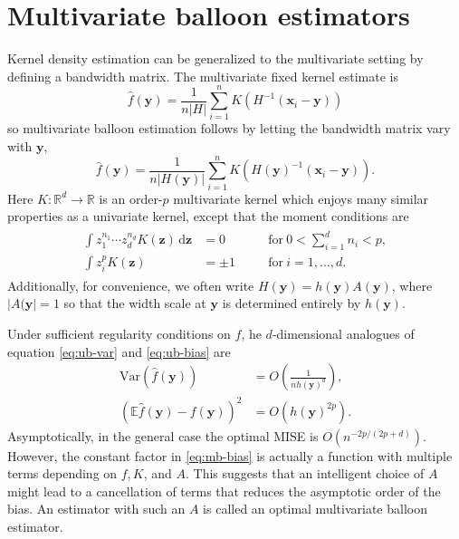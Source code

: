 \documentclass{article}
\newcommand{\E}{\mathbb{E}}
\newcommand{\R}{\mathbb{R}}
\newcommand{\abs}[1]{\left|#1\right|}
\newcommand{\var}[1]{\text{Var}\left(#1\right)}
\newcommand{\dd}[1]{\,\text{d}#1}
\begin{document}
\section{Multivariate balloon estimators}

Kernel density estimation can be generalized to the multivariate setting by defining a bandwidth matrix. The multivariate fixed kernel estimate is
\begin{equation}\label{eq:fixed-width-multid}
    \hat{f}(\mathbf{y}) = \frac{1}{n\vert H\vert}\sum_{i=1}^n K\left(H^{-1}(\mathbf{x}_i - \mathbf{y})\right)
\end{equation}
so multivariate balloon estimation follows by letting the bandwidth matrix vary with $\mathbf{y}$,
\begin{equation}\label{eq:balloon-multi}
    \hat{f}(\mathbf{y}) = \frac{1}{n\vert H(\mathbf{y})\vert}\sum_{i=1}^n K\left(H(\mathbf{y})^{-1}(\mathbf{x}_i - \mathbf{y})\right).
\end{equation}
Here $K : \R^d \to \R$ is an order-$p$ multivariate kernel which enjoys many similar properties as a univariate kernel, except that the moment conditions are 
\begin{align}
    \begin{aligned}
        \int z_1^{n_1} \cdots z_d^{n_d} K(\mathbf{z}) \dd{\mathbf{z}} &= 0& &\quad \text{for} \ 0 < \sum_{i=1}^d n_i < p, \\
        \int z_i^p K(\mathbf{z}) &= \pm 1& &\quad \text{for} \ i = 1, \dots, d.
    \end{aligned}
\end{align}
Additionally, for convenience, we often write $H(\mathbf{y}) = h(\mathbf{y})A(\mathbf{y})$, where $\abs{A(\mathbf{y}} = 1$ so that the width scale at $\mathbf{y}$ is determined entirely by $h(\mathbf{y})$.

Under sufficient regularity conditions on $f$, he $d$-dimensional analogues of equation \eqref{eq:ub-var} and \eqref{eq:ub-bias} are 
\begin{align}
    \var{\hat{f}(\mathbf{y})} &= O\left(\frac{1}{nh(\mathbf{y})^d}\right), \label{eq:mb-var} \\
    \left(\E \hat{f}(\mathbf{y}) - f(\mathbf{y})\right)^2 &= O\left(h(\mathbf{y})^{2p}\right). \label{eq:mb-bias}
\end{align}
Asymptotically, in the general case the optimal MISE is $O\left(n^{-2p/(2p+d)}\right)$. However, the constant factor in \eqref{eq:mb-bias} is actually a function with multiple terms depending on $f, K$, and $A$. This suggests that an intelligent choice of $A$ might lead to a cancellation of terms that reduces the asymptotic order of the bias. An estimator with such an $A$ is called an optimal multivariate balloon estimator. 
\end{document}
